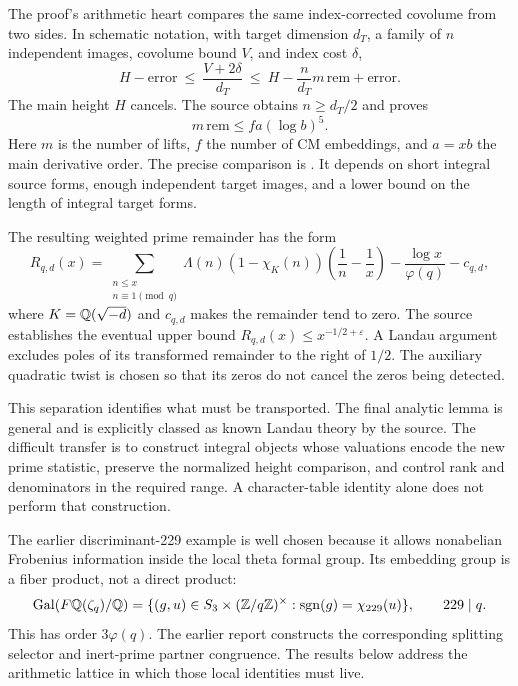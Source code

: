 The proof's arithmetic heart compares the same index-corrected covolume from two sides. In schematic notation, with target dimension $d_T$, a family of $n$ independent images, covolume bound $V$, and index cost $\delta$,
\[
 H-\text{error}\ \le\ \frac{V+2\delta}{d_T}
 \ \le\ H-\frac{n}{d_T}m\,\mathrm{rem}+\text{error}.
\]
The main height $H$ cancels. The source obtains $n\ge d_T/2$ and proves
\begin{equation}\label{eq:star}
 m\,\mathrm{rem}\le f a(\log b)^5.
\end{equation}
Here $m$ is the number of lifts, $f$ the number of CM embeddings, and $a=xb$ the main derivative order. The precise comparison is
. It depends on short integral source forms, enough independent target images, and a lower bound on the length of integral target forms.\cite{mainInequality}

The resulting weighted prime remainder has the form
\begin{equation}\label{eq:sourceR}
 R_{q,d}(x)=\sum_{\substack{n\le x\\n\equiv1\pmod q}}
 \Lambda(n)(1-\chi_K(n))\left(\frac1n-\frac1x\right)
 -\frac{\log x}{\varphi(q)}-c_{q,d},
\end{equation}
where $K=\mathbb Q(\sqrt{-d})$ and $c_{q,d}$ makes the remainder tend to zero. The source establishes the eventual upper bound $R_{q,d}(x)\le x^{-1/2+\varepsilon}$. A Landau argument excludes poles of its transformed remainder to the right of $1/2$. The auxiliary quadratic twist is chosen so that its zeros do not cancel the zeros being detected.\cite{oneSided,criterion,Landau}

This separation identifies what must be transported. The final analytic lemma is general and is explicitly classed as known Landau theory by the source. The difficult transfer is to construct integral objects whose valuations encode the new prime statistic, preserve the normalized height comparison, and control rank and denominators in the required range. A character-table identity alone does not perform that construction.

The earlier discriminant-229 example is well chosen because it allows nonabelian Frobenius information inside the local theta formal group. Its embedding group is a fiber product, not a direct product:
\[
 \operatorname{Gal}(F\mathbb Q(\zeta_q)/\mathbb Q)
 =\{(g,u)\in S_3\times(\mathbb Z/q\mathbb Z)^\times:
 \operatorname{sgn}(g)=\chi_{229}(u)\},\qquad229\mid q.
\]
This has order $3\varphi(q)$. The earlier report constructs the corresponding splitting selector and inert-prime partner congruence. The results below address the arithmetic lattice in which those local identities must live.\cite{priorSynthesis}
